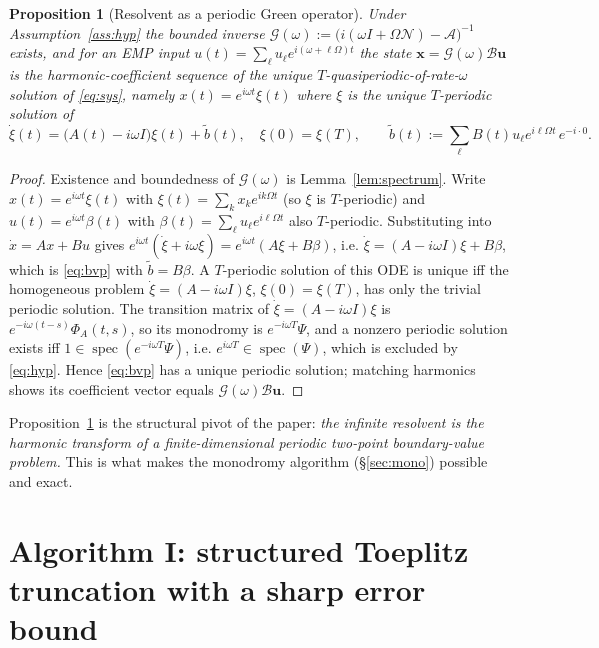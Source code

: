 \documentclass{amsart}
\newtheorem{proposition}{Proposition}
\theoremstyle{definition}
\DeclareMathOperator{\spec}{spec}
\newcommand{\Acal}{\mathcal{A}}
\newcommand{\Bcal}{\mathcal{B}}
\newcommand{\Ncal}{\mathcal{N}}
\begin{document}
\begin{proposition}[Resolvent as a periodic Green operator]\label{prop:green}
Under Assumption~\ref{ass:hyp} the bounded inverse
$\mathcal G(\omega):=\big(i(\omega I+\Omega\Ncal)-\Acal\big)^{-1}$ exists, and
for an EMP input $u(t)=\sum_\ell u_\ell e^{i(\omega+\ell\Omega)t}$ the state
$\mathbf x=\mathcal G(\omega)\Bcal\mathbf u$ is the harmonic-coefficient
sequence of the \emph{unique} $T$-quasiperiodic-of-rate-$\omega$ solution of
\eqref{eq:sys}, namely $x(t)=e^{i\omega t}\xi(t)$ where $\xi$ is the unique
$T$-periodic solution of
\begin{equation}\label{eq:bvp}
\dot\xi(t)=\big(A(t)-i\omega I\big)\xi(t)+\tilde b(t),\quad \xi(0)=\xi(T),\qquad
\tilde b(t):=\sum_\ell B(t)u_\ell e^{i\ell\Omega t}\,e^{-i\cdot 0}.
\end{equation}
\end{proposition}

\begin{proof}
Existence and boundedness of $\mathcal G(\omega)$ is Lemma~\ref{lem:spectrum}.
Write $x(t)=e^{i\omega t}\xi(t)$ with $\xi(t)=\sum_k x_k e^{ik\Omega t}$ (so
$\xi$ is $T$-periodic) and $u(t)=e^{i\omega t}\beta(t)$ with
$\beta(t)=\sum_\ell u_\ell e^{i\ell\Omega t}$ also $T$-periodic. Substituting
into $\dot x=A x+Bu$ gives
$e^{i\omega t}(\dot\xi+i\omega\xi)=e^{i\omega t}(A\xi+B\beta)$, i.e.
$\dot\xi=(A-i\omega I)\xi+B\beta$, which is \eqref{eq:bvp} with
$\tilde b=B\beta$. A $T$-periodic solution of this ODE is unique iff the
homogeneous problem $\dot\xi=(A-i\omega I)\xi$, $\xi(0)=\xi(T)$, has only the
trivial periodic solution. The transition matrix of $\dot\xi=(A-i\omega I)\xi$
is $e^{-i\omega(t-s)}\Phi_A(t,s)$, so its monodromy is $e^{-i\omega T}\Psi$, and
a nonzero periodic solution exists iff $1\in\spec(e^{-i\omega T}\Psi)$, i.e.
$e^{i\omega T}\in\spec(\Psi)$, which is excluded by \eqref{eq:hyp}. Hence
\eqref{eq:bvp} has a unique periodic solution; matching harmonics shows its
coefficient vector equals $\mathcal G(\omega)\Bcal\mathbf u$.
\end{proof}

Proposition~\ref{prop:green} is the structural pivot of the paper: \emph{the
infinite resolvent is the harmonic transform of a finite-dimensional periodic
two-point boundary-value problem.} This is what makes the monodromy algorithm
(\S\ref{sec:mono}) possible and exact.

\section{Algorithm I: structured Toeplitz truncation with a sharp error bound}
\label{sec:trunc}
\end{document}
